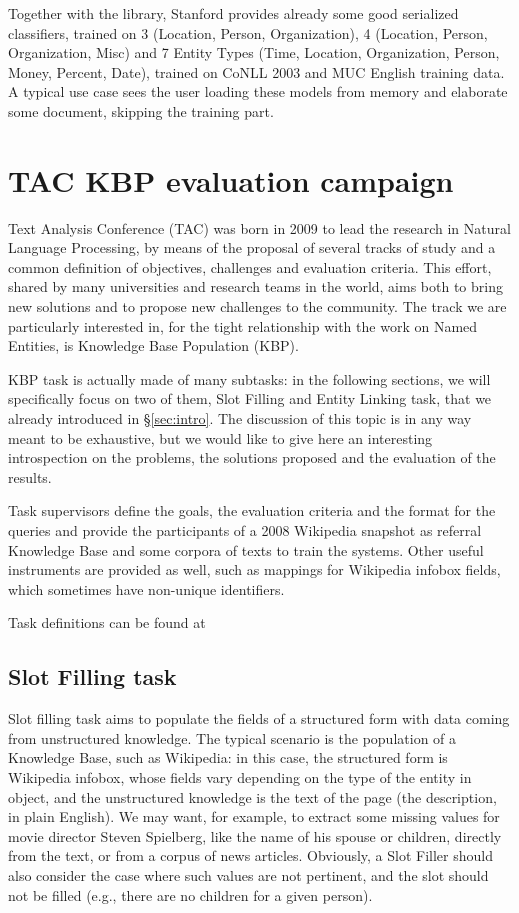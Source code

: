 \documentclass[a4paper,11pt]{report}
\begin{document}
Together with the library, Stanford provides already some good serialized classifiers, trained on 3 (Location, Person, Organization), 4 (Location, Person, Organization, Misc) and 7 Entity Types (Time, Location, Organization, Person, Money, Percent, Date), trained on CoNLL 2003 and MUC English training data. A typical use case sees the user loading these models from memory and elaborate some document, skipping the training part.

\chapter{TAC KBP evaluation campaign}
Text Analysis Conference (TAC) was born in 2009 to lead the research in Natural Language Processing, by means of the proposal of several tracks of study and a common definition of objectives, challenges and evaluation criteria. This effort, shared by many universities and research teams in the world, aims both to bring new solutions and to propose new challenges to the community. The track we are particularly interested in, for the tight relationship with the work on Named Entities, is Knowledge Base Population (KBP).

KBP task is actually made of many subtasks: in the following sections, we will specifically focus on two of them, Slot Filling and Entity Linking task, that we already introduced in \S \ref{sec:intro}. The discussion of this topic is in any way meant to be exhaustive, but we would like to give here an interesting introspection on the problems, the solutions proposed and the evaluation of the results.

Task supervisors define the goals, the evaluation criteria and the format for the queries and provide the participants of a 2008 Wikipedia snapshot as referral Knowledge Base and some corpora of texts to train the systems. Other useful instruments are provided as well, such as mappings for Wikipedia infobox fields, which sometimes have non-unique identifiers.

Task definitions can be found at %


\section{Slot Filling task}
Slot filling task aims to populate the fields of a structured form with data coming from unstructured knowledge. The typical scenario is the population of a Knowledge Base, such as Wikipedia: in this case, the structured form is Wikipedia infobox, whose fields vary depending on the type of the entity in object, and the unstructured knowledge is the text of the page (the description, in plain English).
We may want, for example, to extract some missing values for movie director Steven Spielberg, like the name of his spouse or children, directly from the text, or from a corpus of news articles. Obviously, a Slot Filler should also consider the case where such values are not pertinent, and the slot should not be filled (e.g., there are no children for a given person).
\end{document}
